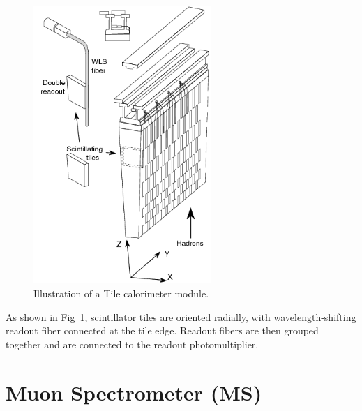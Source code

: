 \begin{figure}[htbp!]
 \begin{center}
 \includegraphics[width=0.6\textwidth]{chapters/c4/figures/tile}
 \end{center}
 \caption{Illustration of a Tile calorimeter module.}
 \label{fig:Tile}
\end{figure}

\par As shown in Fig~\ref{fig:Tile}, scintillator tiles are oriented radially, with wavelength-shifting readout fiber connected at the tile edge. Readout fibers are then grouped together and are connected to the readout photomultiplier.

\section{Muon Spectrometer (MS)}
\label{sec:muon}

